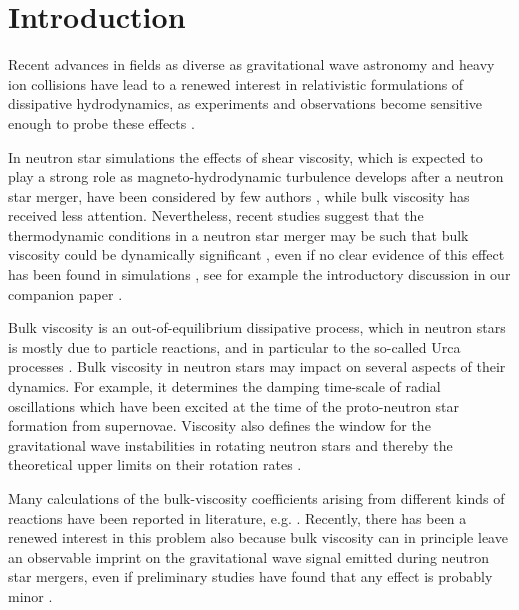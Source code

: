 \documentclass[aps,prd,twocolumn,a4paper,floatfix,nofootbib,superscriptaddress,nofootinbib]{revtex4}
\begin{document}
\maketitle

\section{Introduction}
\label{sec:intro}

Recent advances in fields as diverse as gravitational wave astronomy and heavy
ion collisions have lead to a renewed interest in relativistic formulations of
dissipative hydrodynamics, as experiments and observations become sensitive
enough to probe these effects \cite{Romatchke2017,Florkowski2018,lhc2018}.

In neutron star simulations the effects of shear viscosity, which is expected
to play a strong role as magneto-hydrodynamic turbulence develops after a
neutron star merger, have been considered by few authors \citep{Kiuchi18,
Radice17, Shibata17, RadiceEjecta, Vigano20, Radice20, Shibata21}, while bulk
viscosity has received less attention. Nevertheless, recent studies suggest
that the thermodynamic conditions in a neutron star merger may be such that
bulk viscosity could be dynamically significant \citep{Haensel_Bulk_Urca,
Yakovlev_review_2001, Schmitt_review_2018, AlfordRezzolla}, even if no clear
evidence of this effect has been found in simulations \citep{Perego19, Most21,
Hammond2021, Radice22}, see for example the introductory discussion in our
companion paper \citep{Camelio22a}.
 
Bulk viscosity is an out-of-equilibrium dissipative process, which in
neutron stars is mostly due to particle reactions, and in particular to
the so-called Urca processes \citep{Haensel_Bulk_Urca}.  Bulk viscosity in neutron stars may impact on several aspects of their
dynamics.  For example, it determines the damping time-scale of radial
oscillations which have been excited at the time of the proto-neutron star
formation from supernovae. Viscosity also defines the window for the
gravitational wave instabilities in rotating neutron stars \citep{cutler1987,
cutler1990ApJ, andersson_jones_2000} and thereby the theoretical upper limits
on their rotation rates \citep{lindblom_1986ApJ}.

Many calculations of the bulk-viscosity coefficients arising from different
kinds of reactions have been reported in literature, e.g. 
\citep{Haensel_Bulk_Urca,haensel_bulkI,haensel_bulkII,Gusakov_kantor_2008,Haensel_Bulk_hyperons,AlfordBulk,alford_bulk_trapped}. 
Recently, there has been a renewed interest in this problem also because bulk viscosity
can in principle leave an observable imprint on the gravitational wave signal emitted during
neutron star mergers, even if preliminary studies have found that any effect
is probably minor \citep{Perego19, Most21, Hammond2021, Radice22, Zappa23}.
\end{document}
